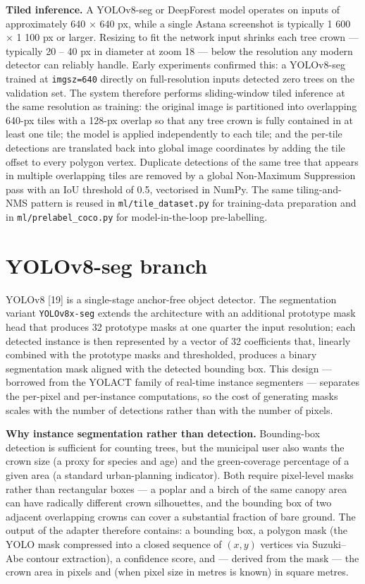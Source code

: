 \textbf{Tiled inference.} A YOLOv8-seg or DeepForest model operates on inputs of approximately 640 × 640 px, while a single Astana screenshot is typically 1 600 × 1 100 px or larger. Resizing to fit the network input shrinks each tree crown --- typically 20 -- 40 px in diameter at zoom 18 --- below the resolution any modern detector can reliably handle. Early experiments confirmed this: a YOLOv8-seg trained at \texttt{imgsz=640} directly on full-resolution inputs detected zero trees on the validation set. The system therefore performs sliding-window tiled inference at the same resolution as training: the original image is partitioned into overlapping 640-px tiles with a 128-px overlap so that any tree crown is fully contained in at least one tile; the model is applied independently to each tile; and the per-tile detections are translated back into global image coordinates by adding the tile offset to every polygon vertex. Duplicate detections of the same tree that appears in multiple overlapping tiles are removed by a global Non-Maximum Suppression pass with an IoU threshold of 0.5, vectorised in NumPy. The same tiling-and-NMS pattern is reused in \texttt{ml/tile\_dataset.py} for training-data preparation and in \texttt{ml/prelabel\_coco.py} for model-in-the-loop pre-labelling.

\section{YOLOv8-seg branch}\label{yolov8-seg-branch}

YOLOv8 {[}19{]} is a single-stage anchor-free object detector. The segmentation variant \texttt{YOLOv8x-seg} extends the architecture with an additional prototype mask head that produces 32 prototype masks at one quarter the input resolution; each detected instance is then represented by a vector of 32 coefficients that, linearly combined with the prototype masks and thresholded, produces a binary segmentation mask aligned with the detected bounding box. This design --- borrowed from the YOLACT family of real-time instance segmenters --- separates the per-pixel and per-instance computations, so the cost of generating masks scales with the number of detections rather than with the number of pixels.

\textbf{Why instance segmentation rather than detection.} Bounding-box detection is sufficient for counting trees, but the municipal user also wants the crown size (a proxy for species and age) and the green-coverage percentage of a given area (a standard urban-planning indicator). Both require pixel-level masks rather than rectangular boxes --- a poplar and a birch of the same canopy area can have radically different crown silhouettes, and the bounding box of two adjacent overlapping crowns can cover a substantial fraction of bare ground. The output of the adapter therefore contains: a bounding box, a polygon mask (the YOLO mask compressed into a closed sequence of \((x, y)\) vertices via Suzuki--Abe contour extraction), a confidence score, and --- derived from the mask --- the crown area in pixels and (when pixel size in metres is known) in square metres.

